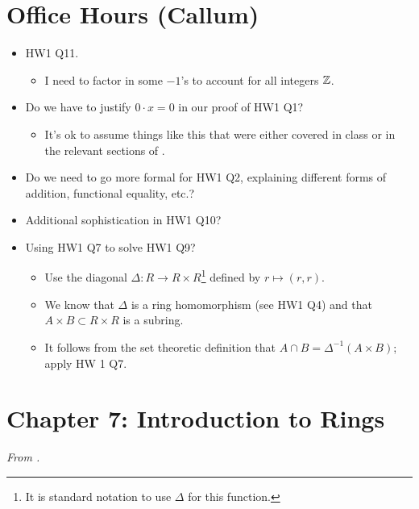 \documentclass[../notes.tex]{subfiles}
\begin{document}
\section{Office Hours (Callum)}
\begin{itemize}
    \item HW1 Q11.
    \begin{itemize}
        \item I need to factor in some $-1$'s to account for all integers $\mathbb{Z}$.
    \end{itemize}
    \item Do we have to justify $0\cdot x=0$ in our proof of HW1 Q1?
    \begin{itemize}
        \item It's ok to assume things like this that were either covered in class or in the relevant sections of \textcite{bib:DummitFoote}.
    \end{itemize}
    \item Do we need to go more formal for HW1 Q2, explaining different forms of addition, functional equality, etc.?
    \item Additional sophistication in HW1 Q10?
    \item Using HW1 Q7 to solve HW1 Q9?
    \begin{itemize}
        \item Use the diagonal $\Delta:R\to R\times R$\footnote{It is standard notation to use $\Delta$ for this function.} defined by $r\mapsto(r,r)$.
        \item We know that $\Delta$ is a ring homomorphism (see HW1 Q4) and that $A\times B\subset R\times R$ is a subring.
        \item It follows from the set theoretic definition that $A\cap B=\Delta^{-1}(A\times B)$; apply HW 1 Q7.
    \end{itemize}
\end{itemize}



\section{Chapter 7: Introduction to Rings}
\emph{From \textcite{bib:DummitFoote}.}
\end{document}
